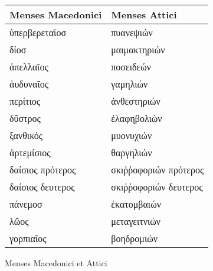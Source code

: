 %
\footnotesize
\centering
\begin{tabular}{@{}l l@{}}
\toprule
 Menses Macedonici    & Menses Attici \\
\midrule
 \textgreek{ὑπερβερεταῖοσ} &
 \textgreek{πυανεψιών}
\\
 \textgreek{δίοσ} &
 \textgreek{μαιμακτηριών}
\\
 \textgreek{ἀπελλαῖος} &
 \textgreek{ποσειδεών}
\\
\midrule
 \textgreek{ἀυδυναῖος} &
 \textgreek{γαμηλιών}
\\
 \textgreek{περίτιος} &
 \textgreek{ἀνθεστηριών}
\\
 \textgreek{δῦστρος} &
 \textgreek{ἐλαφηβολιών}
\\
\midrule
 \textgreek{ξανθικός} &
 \textgreek{μυονυχιών}
\\
 \textgreek{ἀρτεμίσιος} &
 \textgreek{θαργηλιών}
\\
 \textgreek{δαίσιος πρότερος} &
 \textgreek{σκιῤῥοφοριών πρότερος}
\\
 \textgreek{δαίσιος δευτερος} &
 \textgreek{σκιῤῥοφοριών δευτερος}
\\
\midrule
 \textgreek{πάνεμοσ} &
 \textgreek{ἑκατομβαιών}
\\
 \textgreek{λῶος} & 
 \textgreek{μεταγειτνιών}
\\
 \textgreek{γορπιαῖος} &
 \textgreek{βοηδρομιών}
\\
\bottomrule
\end{tabular}
%
\caption{Menses Macedonici et Attici}
%